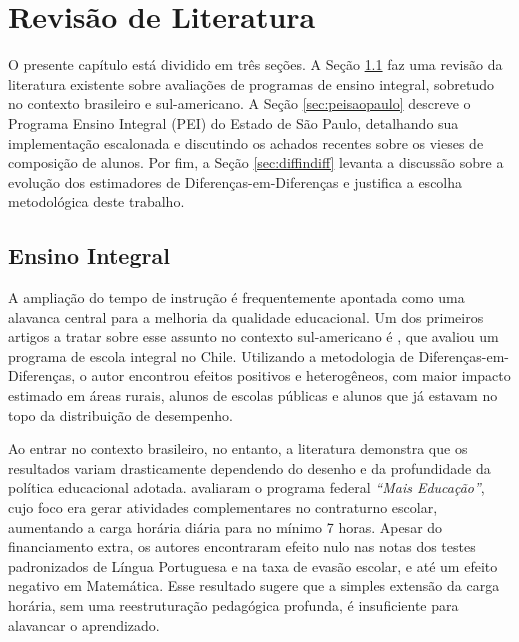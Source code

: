 \chapter{Revisão de Literatura} \label{sec:literature}

O presente capítulo está dividido em três seções. A Seção \ref{sec:ensinointegral} faz uma revisão da literatura existente sobre avaliações de programas de ensino integral, sobretudo no contexto brasileiro e sul-americano. A Seção \ref{sec:peisaopaulo} descreve o Programa Ensino Integral (PEI) do Estado de São Paulo, detalhando sua implementação escalonada e discutindo os achados recentes sobre os vieses de composição de alunos. Por fim, a Seção \ref{sec:diffindiff} levanta a discussão sobre a evolução dos estimadores de Diferenças-em-Diferenças e justifica a escolha metodológica deste trabalho.

\section{Ensino Integral} \label{sec:ensinointegral}

A ampliação do tempo de instrução é frequentemente apontada como uma alavanca central para a melhoria da qualidade educacional. Um dos primeiros artigos a tratar sobre esse assunto no contexto sul-americano é \textcite{bellei2009}, que avaliou um programa de escola integral no Chile. Utilizando a metodologia de Diferenças-em-Diferenças, o autor encontrou efeitos positivos e heterogêneos, com maior impacto estimado em áreas rurais, alunos de escolas públicas e alunos que já estavam no topo da distribuição de desempenho.

Ao entrar no contexto brasileiro, no entanto, a literatura demonstra que os resultados variam drasticamente dependendo do desenho e da profundidade da política educacional adotada. \textcite{AlmeidaEtAl2016MaisEducacao} avaliaram o programa federal \textit{``Mais Educação''}, cujo foco era gerar atividades complementares no contraturno escolar, aumentando a carga horária diária para no mínimo 7 horas. Apesar do financiamento extra, os autores encontraram efeito nulo nas notas dos testes padronizados de Língua Portuguesa e na taxa de evasão escolar, e até um efeito negativo em Matemática. Esse resultado sugere que a simples extensão da carga horária, sem uma reestruturação pedagógica profunda, é insuficiente para alavancar o aprendizado.

